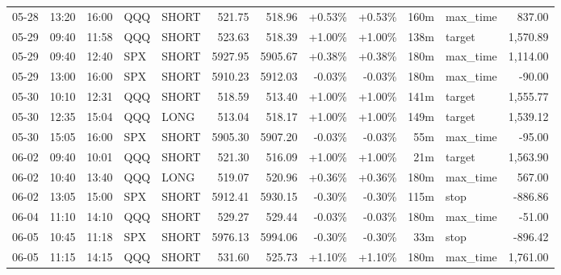 \documentclass[11pt,a4paper,twoside]{article}
\begin{document}
\begin{center}
\begin{longtable}{>{\color{txtmain}}l l l l l r r r r r >{\color{txtmain}}l r}
05-28 & 13:20 & 16:00 & QQQ & SHORT & 521.75 & 518.96 & \textcolor{wingreen}{+0.53\%} & \textcolor{wingreen}{+0.53\%} & 160m & max\_time & \textcolor{wingreen}{837.00} \\
05-29 & 09:40 & 11:58 & QQQ & SHORT & 523.63 & 518.39 & \textcolor{wingreen}{+1.00\%} & \textcolor{wingreen}{+1.00\%} & 138m & target & \textcolor{wingreen}{1,570.89} \\
05-29 & 09:40 & 12:40 & SPX & SHORT & 5927.95 & 5905.67 & \textcolor{wingreen}{+0.38\%} & \textcolor{wingreen}{+0.38\%} & 180m & max\_time & \textcolor{wingreen}{1,114.00} \\
05-29 & 13:00 & 16:00 & SPX & SHORT & 5910.23 & 5912.03 & \textcolor{lossred}{-0.03\%} & \textcolor{lossred}{-0.03\%} & 180m & max\_time & \textcolor{lossred}{-90.00} \\
05-30 & 10:10 & 12:31 & QQQ & SHORT & 518.59 & 513.40 & \textcolor{wingreen}{+1.00\%} & \textcolor{wingreen}{+1.00\%} & 141m & target & \textcolor{wingreen}{1,555.77} \\
05-30 & 12:35 & 15:04 & QQQ & LONG & 513.04 & 518.17 & \textcolor{wingreen}{+1.00\%} & \textcolor{wingreen}{+1.00\%} & 149m & target & \textcolor{wingreen}{1,539.12} \\
05-30 & 15:05 & 16:00 & SPX & SHORT & 5905.30 & 5907.20 & \textcolor{lossred}{-0.03\%} & \textcolor{lossred}{-0.03\%} & 55m & max\_time & \textcolor{lossred}{-95.00} \\
06-02 & 09:40 & 10:01 & QQQ & SHORT & 521.30 & 516.09 & \textcolor{wingreen}{+1.00\%} & \textcolor{wingreen}{+1.00\%} & 21m & target & \textcolor{wingreen}{1,563.90} \\
06-02 & 10:40 & 13:40 & QQQ & LONG & 519.07 & 520.96 & \textcolor{wingreen}{+0.36\%} & \textcolor{wingreen}{+0.36\%} & 180m & max\_time & \textcolor{wingreen}{567.00} \\
06-02 & 13:05 & 15:00 & SPX & SHORT & 5912.41 & 5930.15 & \textcolor{lossred}{-0.30\%} & \textcolor{lossred}{-0.30\%} & 115m & stop & \textcolor{lossred}{-886.86} \\
06-04 & 11:10 & 14:10 & QQQ & SHORT & 529.27 & 529.44 & \textcolor{lossred}{-0.03\%} & \textcolor{lossred}{-0.03\%} & 180m & max\_time & \textcolor{lossred}{-51.00} \\
06-05 & 10:45 & 11:18 & SPX & SHORT & 5976.13 & 5994.06 & \textcolor{lossred}{-0.30\%} & \textcolor{lossred}{-0.30\%} & 33m & stop & \textcolor{lossred}{-896.42} \\
06-05 & 11:15 & 14:15 & QQQ & SHORT & 531.60 & 525.73 & \textcolor{wingreen}{+1.10\%} & \textcolor{wingreen}{+1.10\%} & 180m & max\_time & \textcolor{wingreen}{1,761.00} \\

\end{longtable}
\end{center}
\end{document}
